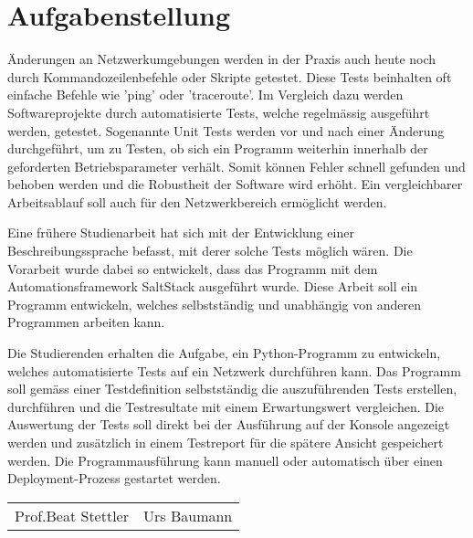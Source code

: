 \documentclass[]{subfiles}
\begin{document}
\section*{Aufgabenstellung}

Änderungen an Netzwerkumgebungen werden in der Praxis auch heute 
noch durch Kommandozeilenbefehle oder Skripte getestet.
Diese Tests beinhalten oft einfache Befehle wie 'ping' oder 'traceroute'.
Im Vergleich dazu werden Softwareprojekte durch automatisierte Tests, 
welche regelmässig ausgeführt werden, getestet.
Sogenannte Unit Tests werden vor und nach einer Änderung durchgeführt, 
um zu Testen, ob sich ein Programm weiterhin innerhalb der geforderten 
Betriebsparameter verhält. 
Somit können Fehler schnell gefunden und behoben werden und die Robustheit
der Software wird erhöht.
Ein vergleichbarer Arbeitsablauf soll auch für den Netzwerkbereich ermöglicht werden.

Eine frühere Studienarbeit hat sich mit der Entwicklung einer Beschreibungssprache
befasst, mit derer solche Tests möglich wären.
Die Vorarbeit wurde dabei so entwickelt, dass das Programm mit dem Automationsframework 
SaltStack ausgeführt wurde. 
Diese Arbeit soll ein Programm entwickeln, welches selbstständig und unabhängig 
von anderen Programmen arbeiten kann.

Die Studierenden erhalten die Aufgabe, ein Python-Programm zu entwickeln, 
welches automatisierte Tests auf ein Netzwerk durchführen kann.
Das Programm soll gemäss einer Testdefinition selbstständig die 
auszuführenden Tests erstellen, durchführen und die Testresultate mit
einem Erwartungswert vergleichen. 
Die Auswertung der Tests soll direkt bei der Ausführung auf der Konsole
angezeigt werden und zusätzlich in einem Testreport für die spätere 
Ansicht gespeichert werden.
Die Programmausführung kann manuell oder automatisch über einen Deployment-Prozess
gestartet werden.

\vspace{5cm}

\begin{tabularx}{\textwidth}{XX}
    Prof.Beat Stettler & Urs Baumann \\
\end{tabularx}

    
\end{document}
